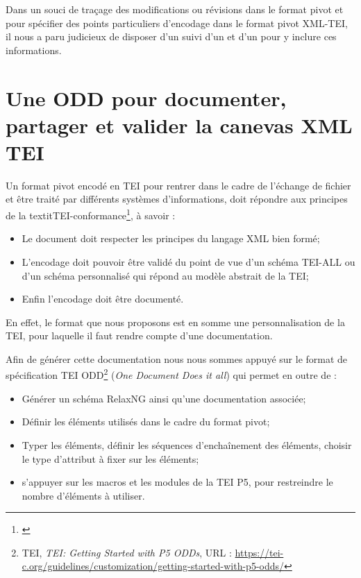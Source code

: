Dans un souci de traçage des modifications ou révisions dans le format pivot et pour spécifier des points particuliers d'encodage dans le format pivot XML-TEI, il nous a paru judicieux de disposer d'un  suivi d'un 
 et d'un  pour y inclure ces informations.

\section{Une ODD pour documenter, partager et valider la canevas XML TEI}

Un format pivot encodé en TEI pour rentrer dans le cadre de l'échange de fichier et être traité par différents systèmes d'informations, doit répondre aux principes de la textit{TEI-conformance}\footnote{\cite{camps_structuration_2017}}, à savoir :
\begin{itemize}
    \item Le document doit respecter les principes du langage XML bien formé;
    \item L'encodage doit pouvoir être validé du point de vue d'un schéma TEI-ALL ou d'un schéma personnalisé qui répond au modèle abstrait de la TEI;
    \item Enfin l'encodage doit être documenté.
\end{itemize}

En effet, le format que nous proposons est en somme une personnalisation de la TEI, pour laquelle il faut rendre compte d'une documentation.

Afin de générer cette documentation nous nous sommes appuyé sur le format de spécification TEI ODD\footnote{TEI, \textit{TEI: Getting Started with P5 ODDs}, URL : \url{https://tei-c.org/guidelines/customization/getting-started-with-p5-odds/}} (\textit{One Document Does it all}) qui permet en outre de :
\begin{itemize}
    \item Générer un schéma RelaxNG ainsi qu'une documentation associée;
    \item Définir les éléments utilisés dans le cadre du format pivot;
    \item Typer les éléments, définir les séquences d'enchaînement des éléments, choisir le type d'attribut à fixer sur les éléments;
    \item s'appuyer sur les macros et les modules de la TEI P5, pour restreindre le nombre d'éléments à utiliser.
\end{itemize}

